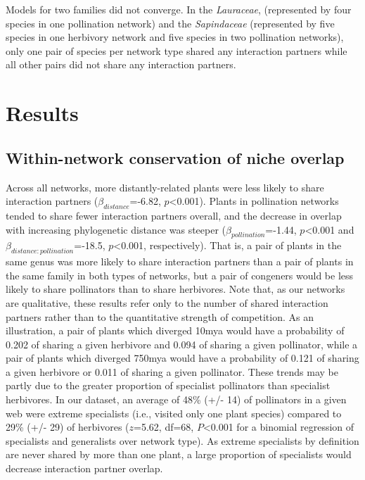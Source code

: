 \documentclass[12pt]{article}
\begin{document}
\begin{spacing}{1.5}
    Models for two families did not converge. In the \emph{Lauraceae}, (represented by four species in one pollination network) and the \emph{Sapindaceae} (represented by five species in one herbivory network and five species in two pollination networks), only one pair of species per network type shared any interaction partners while all other pairs did not share any interaction partners.


\section*{Results}


  \subsection*{Within-network conservation of niche overlap} 

    Across all networks, more distantly-related plants were less likely to 
    share interaction partners ($\beta_{distance}$=-6.82, 
    $p$\textless0.001). Plants in pollination networks tended to share 
    fewer interaction partners overall, and the decrease in overlap with 
    increasing phylogenetic distance was steeper 
    ($\beta_{pollination}$=-1.44, $p$\textless0.001 and 
    $\beta_{distance:pollination}$=-18.5, $p$\textless0.001, respectively). 
    That is, a pair of plants in the same genus was more likely to share 
    interaction partners than a pair of plants in the same family in both 
    types of networks, but a pair of congeners would be less likely to 
    share pollinators than to share herbivores. Note that, as our networks 
    are qualitative, these results refer only to the number of shared interaction
    partners rather than to the quantitative strength of competition.
    As an illustration, a pair
    of plants which diverged 10mya would have a probability of 0.202 of sharing
    a given herbivore and 0.094 of sharing a given pollinator, while a 
    pair of plants which diverged 750mya would 
    have a probability of 0.121 of sharing a given herbivore or 
    0.011 of sharing a given pollinator.
    These trends may be partly 
    due to the greater proportion of specialist pollinators than specialist 
    herbivores. In our dataset, an average of 48\% (+/- 14) of pollinators 
    in a given web were extreme specialists (i.e., visited only one plant 
    species) compared to 29\% (+/- 29) of herbivores ($z$=5.62, df=68, 
    $P$\textless0.001 for a binomial regression of specialists and 
    generalists over network type). As extreme specialists by definition 
    are never shared by more than one plant, a large proportion of specialists
    would decrease interaction partner overlap.



\end{spacing}
\end{document}
